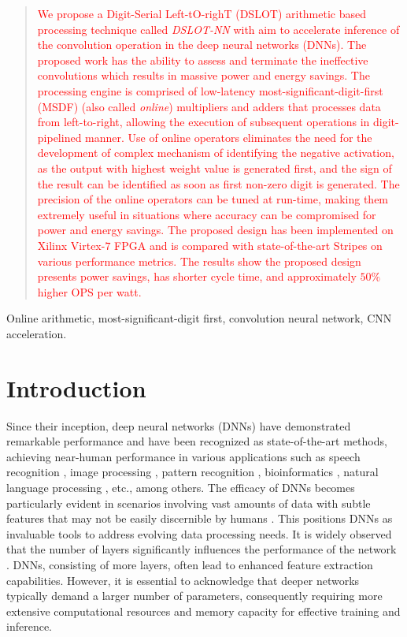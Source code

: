 \documentclass[conference]{IEEEtran}
\begin{document}
\begin{abstract}
\textcolor{red}{We propose a Digit-Serial Left-tO-righT (DSLOT) arithmetic based processing technique called \textit{DSLOT-NN} with aim to accelerate inference of the convolution operation in the deep neural networks (DNNs). The proposed work has the ability to assess and terminate the ineffective convolutions which results in massive power and energy savings. The processing engine is comprised of low-latency most-significant-digit-first (MSDF) (also called \emph{online}) multipliers and adders that processes data from left-to-right, allowing the execution of subsequent operations in digit-pipelined manner. Use of online operators eliminates the need for the development of complex mechanism of identifying the negative activation, as the output with highest weight value is generated first, and the sign of the result can be identified as soon as first non-zero digit is generated. The precision of the online operators can be tuned at run-time, making them extremely useful in situations where accuracy can be compromised for power and energy savings. The proposed design has been implemented on Xilinx Virtex-$7$ FPGA and is compared with state-of-the-art Stripes on various performance metrics. The results show the proposed design presents power savings, has shorter cycle time, and approximately $50\%$ higher OPS per watt.  }


\end{abstract}

\begin{IEEEkeywords}
Online arithmetic, most-significant-digit first, convolution neural network, CNN acceleration. 
\end{IEEEkeywords}

\section{Introduction}

Since their inception, deep neural networks (DNNs) have demonstrated remarkable performance and have been recognized as state-of-the-art methods, achieving near-human performance in various applications such as speech recognition \cite{liu2017survey}, image processing \cite{gao2023ctcnet}, pattern recognition \cite{zhang2016big}, bioinformatics \cite{usman2021aop}, natural language processing \cite{liu2017survey}, etc., among others. The efficacy of DNNs becomes particularly evident in scenarios involving vast amounts of data with subtle features that may not be easily discernible by humans \cite{zhang2016big}. This positions DNNs as invaluable tools to address evolving data processing needs. It is widely observed that the number of layers significantly influences the performance of the network \cite{kwon2019understanding}. DNNs, consisting of more layers, often lead to enhanced feature extraction capabilities. However, it is essential to acknowledge that deeper networks typically demand a larger number of parameters, consequently requiring more extensive computational resources and memory capacity for effective training and inference. 
\end{document}
